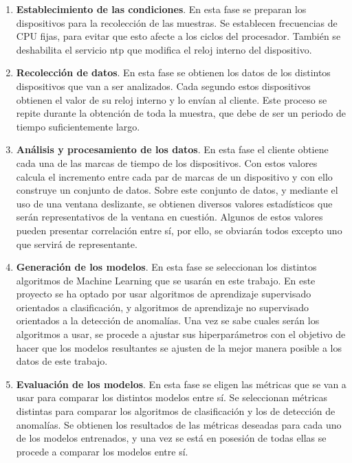 \begin{enumerate}[label=\textbf{\Alph*})]
    \item \textbf{Establecimiento de las condiciones}. En esta fase se preparan los dispositivos para la recolección de las muestras. Se establecen frecuencias de CPU fijas, para evitar que esto afecte a los ciclos del procesador. También se deshabilita el servicio \acrshort{ntp} que modifica el reloj interno del dispositivo.
    \item \textbf{Recolección de datos}. En esta fase se obtienen los datos de los distintos dispositivos que van a ser analizados. Cada segundo estos dispositivos obtienen el valor de su reloj interno y lo envían al cliente. Este proceso se repite durante la obtención de toda la muestra, que debe de ser un periodo de tiempo suficientemente largo.
    \item \textbf{Análisis y procesamiento de los datos}. En esta fase el cliente obtiene cada una de las marcas de tiempo de los dispositivos. Con estos valores calcula el incremento entre cada par de marcas de un dispositivo y con ello construye un conjunto de datos. Sobre este conjunto de datos, y mediante el uso de una ventana deslizante, se obtienen diversos valores estadísticos que serán representativos de la ventana en cuestión. Algunos de estos valores pueden presentar correlación entre sí, por ello, se obviarán todos excepto uno que servirá de representante.
    \item \textbf{Generación de los modelos}. En esta fase se seleccionan los distintos algoritmos de Machine Learning que se usarán en este trabajo. En este proyecto se ha optado por usar algoritmos de aprendizaje supervisado orientados a clasificación, y algoritmos de aprendizaje no supervisado orientados a la detección de anomalías. Una vez se sabe cuales serán los algoritmos a usar, se procede a ajustar sus hiperparámetros con el objetivo de hacer que los modelos resultantes se ajusten de la mejor manera posible a los datos de este trabajo.
    \item \textbf{Evaluación de los modelos}. En esta fase se eligen las métricas que se van a usar para comparar los distintos modelos entre sí. Se seleccionan métricas distintas para comparar los algoritmos de clasificación y los de detección de anomalías. Se obtienen los resultados de las métricas deseadas para cada uno de los modelos entrenados, y una vez se está en posesión de todas ellas se procede a comparar los modelos entre sí.
\end{enumerate}

